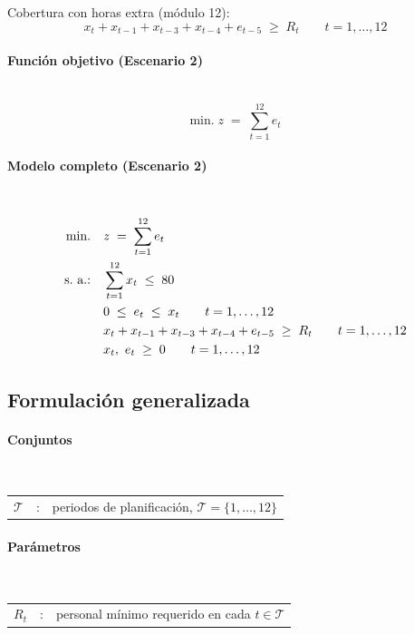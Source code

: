\noindent Cobertura con horas extra (módulo 12):
\begin{equation}
    x_t + x_{t-1} + x_{t-3} + x_{t-4} + e_{t-5} \;\geq\; R_t \qquad t=1,\dots,12
\end{equation}

\paragraph{Función objetivo (Escenario 2)}\mbox{}\\
\begin{equation}
\mbox{min.}\; z \;=\; \sum_{t=1}^{12} e_t
\end{equation}

\paragraph{Modelo completo (Escenario 2)}\mbox{}\\
\begin{align}
\mbox{min.}\quad & z \;=\; \sum_{t=1}^{12} e_t \notag \\
\mbox{s.\ a.:}\quad 
& \sum_{t=1}^{12} x_t \;\leq\; 80 \notag \\
& 0 \;\leq\; e_t \;\leq\; x_t \qquad t=1,\dots,12 \notag \\
& x_t + x_{t-1} + x_{t-3} + x_{t-4} + e_{t-5} \;\geq\; R_t \qquad t=1,\dots,12 \notag \\
& x_t,\ e_t \;\geq\; 0 \qquad t=1,\dots,12 \notag
\end{align}

\subsection{Formulación generalizada}

\paragraph{Conjuntos}\mbox{}\\
\begin{tabular}{l c l}
    $\mathcal{T}$ & : & periodos de planificación, $\mathcal{T}=\{1,\dots,12\}$\\
\end{tabular}

\paragraph{Parámetros}\mbox{}\\
\begin{tabular}{l c l}
    $R_t$ & : & personal mínimo requerido en cada $t\in\mathcal{T}$\\
\end{tabular}

